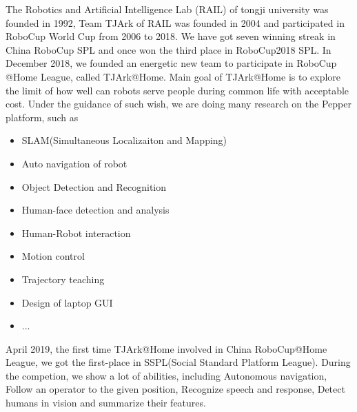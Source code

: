 The Robotics and Artificial Intelligence Lab (RAIL) of tongji university was founded in 1992, Team TJArk of RAIL was founded in 2004 and participated in RoboCup World Cup from 2006 to 2018. We have got seven winning streak in China RoboCup SPL and once won the third place in RoboCup2018 SPL.
In December 2018, we founded an energetic new team to participate in RoboCup @Home League, called TJArk@Home. Main goal of TJArk@Home is to explore the limit of how well can robots serve people during common life with acceptable cost. Under the guidance of such wish, we are doing many research on the Pepper platform, such as
\begin{itemize}
\item SLAM(Simultaneous Localizaiton and Mapping)
\item Auto navigation of robot
\item Object Detection and Recognition
\item Human-face detection and analysis
\item Human-Robot interaction
\item Motion control
\item Trajectory teaching
\item Design of laptop GUI
\item ...
\end{itemize}
April 2019,  the first time TJArk@Home involved in China RoboCup@Home League, we got the first-place in SSPL(Social Standard Platform League). 
During the competion, we show a lot of abilities, including 
Autonomous navigation, 
Follow an operator to the given position, 
Recognize speech and response, 
Detect humans in vision and summarize their features.
